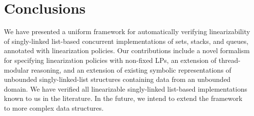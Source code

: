 \section{Conclusions}
\label{sec:conclusion}
\vspace*{-6pt}
We have presented a uniform framework for automatically verifying
linearizability of  singly-linked list-based concurrent implementations of
sets, stacks, and queues, annotated with linearization policies.
Our contributions include a novel formalism for specifying
linearization policies with non-fixed LPs, an extension of thread-modular
reasoning, and an extension of existing symbolic representations
of unbounded singly-linked-list structures containing data from
an unbounded domain.
We have verified all linearizable singly-linked list-based implementations
known to us in the literature.
%
In the future,
we intend to extend the framework to more
complex data structures.

